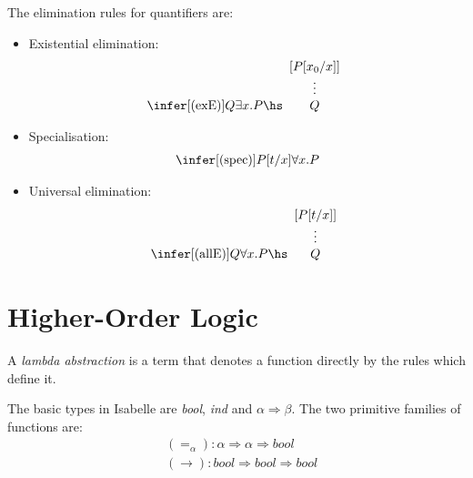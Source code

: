 \documentclass{article}
\begin{document}
\begin{definition}
    The elimination rules for quantifiers are:
    \begin{itemize}
        \item Existential elimination: \begin{align*}
            \infer[(\text{exE})]{Q}{\exists x.P\hs \begin{array}[b]{c}
                [P[x_0/x]]\\
                \vdots \\
                Q
            \end{array}}
        \end{align*}
        \item Specialisation: \begin{align*}
            \infer[(\text{spec})]{P[t/x]}{\forall x.P}
        \end{align*}
        \item Universal elimination: \begin{align*}
            \infer[(\text{allE})]{Q}{\forall x.P\hs \begin{array}[b]{c}
                [P[t/x]]\\
                \vdots \\
                Q
            \end{array}}
        \end{align*}
    \end{itemize}
\end{definition}

\section{Higher-Order Logic}

\begin{definition}
    A \emph{lambda abstraction} is a term that denotes a function directly by the 
    rules which define it.
\end{definition}

\begin{definition}
    The basic types in Isabelle are \emph{bool}, \emph{ind} and $\alpha\Rightarrow\beta$.
    The two primitive families of functions are:
    \begin{align*}
        &(=_\alpha): \alpha\Rightarrow \alpha \Rightarrow \textit{bool}\\
        &(\rightarrow): \textit{bool} \Rightarrow\textit{bool}\Rightarrow\textit{bool}
    \end{align*}
\end{definition}
\end{document}
